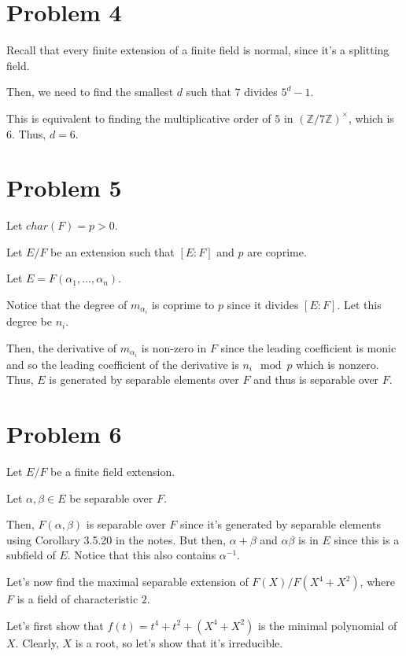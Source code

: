 \documentclass{article}
\theoremstyle{definition}
\begin{document}
\section{Problem 4}

Recall that every finite extension of a finite field is normal, since it's a splitting field.

Then, we need to find the smallest $ d $ such that $ 7 $ divides $ 5^{d} - 1 $.

This is equivalent to finding the multiplicative order of $ 5 $ in $ (\mathbb{Z} / 7 \mathbb{Z})^{\times} $,
which is $ 6 $. Thus, $ d = 6 $.

\section{Problem 5}

Let $ char(F) = p > 0 $.

Let $ E/F $ be an extension such that $ [E : F] $ and $ p $ are coprime.

Let $ E = F(\alpha_{1}, \ldots, \alpha_{n}) $.

Notice that the degree of $ m_{\alpha_{i}} $ is coprime to $ p $ since it divides $ [E:F] $.
Let this degree be $ n_{i} $.

Then, the derivative of $ m_{\alpha_{i}} $ is non-zero in $ F $ since the leading coefficient is monic
and so the leading coefficient of the derivative is $ n_{i} \mod p $ which is nonzero. Thus, $ E $
is generated by separable elements over $ F $ and thus is separable over $ F $.

\section{Problem 6}

Let $ E/F $ be a finite field extension.

Let $ \alpha, \beta \in E $ be separable over $ F $.

Then, $ F(\alpha, \beta) $ is separable over $ F $ since it's generated by separable elements
using Corollary 3.5.20 in the notes. But then, $ \alpha + \beta $ and $ \alpha \beta $ is in $ E $
since this is a subfield of $ E $. Notice that this also contains $ \alpha^{-1} $.

Let's now find the maximal separable extension of $ F(X) / F(X^{4} + X^{2}) $, where $ F $ is
a field of characteristic $ 2 $.

Let's first show that $ f(t) = t^{4} + t^{2} + (X^{4} + X^{2}) $ is the minimal polynomial of $ X $.
Clearly, $ X $ is a root, so let's show that it's irreducible.
\end{document}

